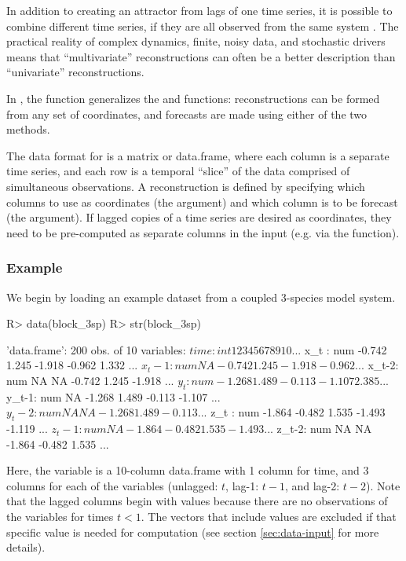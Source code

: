 \documentclass[article]{jss}
\begin{document}
In addition to creating an attractor from lags of one time series, it is possible to combine different time series, if they are all observed from the same system \citep{Sauer_1991, Deyle_2011}. The practical reality of complex dynamics, finite, noisy data, and stochastic drivers means that ``multivariate'' reconstructions can often be a better description than ``univariate'' reconstructions.

In , the  function generalizes the  and  functions: reconstructions can be formed from any set of coordinates, and forecasts are made using either of the two methods.

The data format for  is a matrix or data.frame, where each column is a separate time series, and each row is a temporal ``slice'' of the data comprised of simultaneous observations. A reconstruction is defined by specifying which columns to use as coordinates (the  argument) and which column is to be forecast (the  argument). If lagged copies of a time series are desired as coordinates, they need to be pre-computed as separate columns in the input (e.g. via the  function).

\subsubsection{Example}\label{sec:block-lnlp-example}

We begin by loading an example dataset from a coupled 3-species model system.

\begin{Schunk}
\begin{Sinput}
R> data(block_3sp)
R> str(block_3sp)
\end{Sinput}
\begin{Soutput}
'data.frame':	200 obs. of  10 variables:
 $ time : int  1 2 3 4 5 6 7 8 9 10 ...
 $ x_t  : num  -0.742 1.245 -1.918 -0.962 1.332 ...
 $ x_t-1: num  NA -0.742 1.245 -1.918 -0.962 ...
 $ x_t-2: num  NA NA -0.742 1.245 -1.918 ...
 $ y_t  : num  -1.268 1.489 -0.113 -1.107 2.385 ...
 $ y_t-1: num  NA -1.268 1.489 -0.113 -1.107 ...
 $ y_t-2: num  NA NA -1.268 1.489 -0.113 ...
 $ z_t  : num  -1.864 -0.482 1.535 -1.493 -1.119 ...
 $ z_t-1: num  NA -1.864 -0.482 1.535 -1.493 ...
 $ z_t-2: num  NA NA -1.864 -0.482 1.535 ...
\end{Soutput}
\end{Schunk}

Here, the  variable is a 10-column data.frame with 1 column for time, and 3 columns for each of the variables (unlagged: $t$, lag-1: $t-1$, and lag-2: $t-2$). Note that the lagged columns begin with  values because there are no observations of the variables for times $t < 1$. The vectors that include  values are excluded if that specific value is needed for computation (see section \ref{sec:data-input} for more details).
\end{document}
